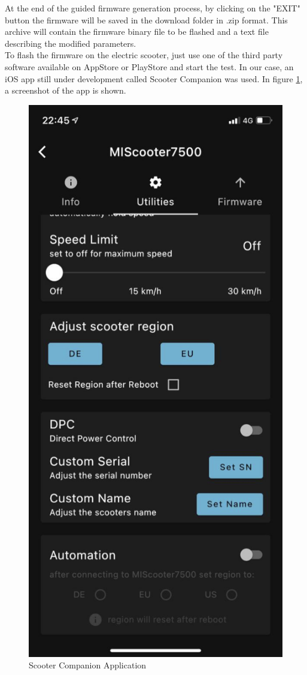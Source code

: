 \documentclass[binding=0.6cm,LaM,noexaminfo]{sapthesis}
\begin{document}
\noindent At the end of the guided firmware generation process, by clicking on the "EXIT" button the firmware will be saved in the download folder in .zip format. This archive will contain the firmware binary file to be flashed and a text file describing the modified parameters.\\
\noindent To flash the firmware on the electric scooter, just use one of the third party software available on AppStore or PlayStore and start the test. In our case, an iOS app still under development called Scooter Companion was used. In figure \ref{fig:scooter_comp_app}, a screenshot of the app is shown.
\begin{figure}[!htp]
    \centering
    \includegraphics[width = .26\textwidth]{images/scooter_companion.jpeg}
    \caption{Scooter Companion Application}
    \label{fig:scooter_comp_app}
\end{figure}
\end{document}
